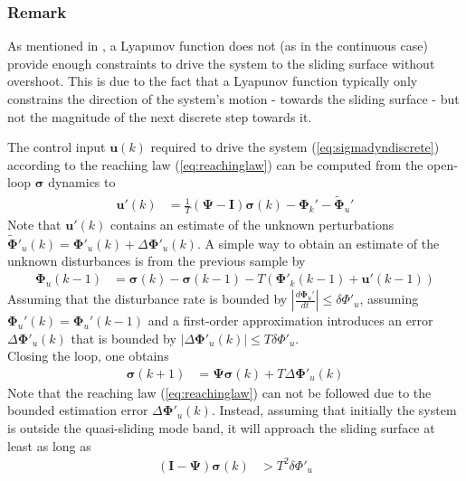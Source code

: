\documentclass{ifacconf}
\providecommand{\mbf}[1]{\mathbf{#1}}
\newcommand{\idxSample}{{\ensuremath{k}}}
\begin{document}
\subsubsection{Remark} As mentioned in \cite{monsees2001discrete}, a Lyapunov function does not (as in the continuous case) provide enough constraints to drive the system to the sliding surface without overshoot. This is due to the fact that a Lyapunov function typically only constrains the direction of the system's motion - towards the sliding surface - but not the magnitude of the next discrete step towards it. 

The control input $\mbf{u}(\idxSample)$ required to drive the system (\ref{eq:sigmadyndiscrete}) according to the reaching law (\ref{eq:reachinglaw}) can be computed from the open-loop $\mbf{\sigma}$ dynamics to
\begin{align}
\mbf{u}'(\idxSample) &= \frac{1}{T}(\mbf{\Psi} - \mbf{I})\mbf{\sigma}(\idxSample) - \mbf{\Phi}_k' - \tilde{\mbf{\Phi}}_u'
\end{align}
Note that $\mbf{u}'(\idxSample)$ contains an estimate of the unknown perturbations $\tilde{\mbf{\Phi}}'_u(\idxSample) = \mbf{\Phi}'_u(\idxSample) + \Delta \mbf{\Phi}'_u(\idxSample)$. 
A simple way to obtain an estimate of the unknown disturbances is from the previous sample by
\begin{align}
\mbf{\Phi}_u(\idxSample-1) &=
\mbf{\sigma}(\idxSample)
-
\mbf{\sigma}(\idxSample-1)
-
T
(\mbf{\Phi}'_k(\idxSample-1) + \mbf{u}'(\idxSample-1))
\end{align}
Assuming that the disturbance rate is bounded by $|\frac{d \mbf{\Phi}_u'}{dt}| \leq \delta \Phi'_u$, assuming $\mbf{\Phi}_u'(\idxSample) = \mbf{\Phi}_u'(\idxSample-1)$ and a first-order approximation introduces an error $\Delta \mbf{\Phi}'_u(\idxSample)$ that is bounded by $|\Delta \mbf{\Phi}'_u(\idxSample)| \leq T \delta \Phi'_u $.\\
Closing the loop, one obtains
\begin{align}
\mbf{\sigma}(\idxSample+1) &= \mbf{\Psi} \mbf{\sigma}(\idxSample) +
T \Delta \mbf{\Phi}'_u(\idxSample)
\end{align}
Note that the reaching law (\ref{eq:reachinglaw}) can not be followed due to the bounded estimation error $\Delta \mbf{\Phi}'_u(\idxSample)$. Instead, assuming that initially the system is outside the quasi-sliding mode band, it will approach the sliding surface at least as long as
\begin{align}
(\mbf{I} - \mbf{\Psi}) \mbf{\sigma}(\idxSample) & > T^2 \delta \Phi'_u
\end{align}
\end{document}
